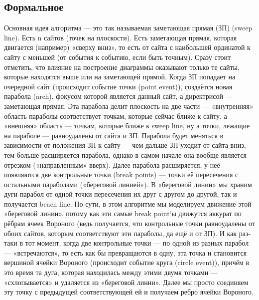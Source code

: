 \documentclass[12 pt, a4paper]{article}
\begin{document}
\subsection{Формальное}
Основная идея алгоритма — это так называемая заметающая прямая (ЗП) (sweep line). Есть n сайтов (точек на плоскости). Есть заметающая прямая, которая двигается (например) «сверху вниз», то есть от сайта с наибольшей ординатой к сайту с меньшей (от события к событию, если быть точным). Сразу стоит отметить, что влияние на построение диаграммы оказывают только те сайты, которые находятся выше или на заметающей прямой.
Когда ЗП попадает на очередной сайт (происходит событие точки (point event)), создаётся новая парабола (arch), фокусом которой является данный сайт, а директрисой — заметающая прямая. Эта парабола делит плоскость на две части — «внутренняя» область параболы соответствует точкам, которые сейчас ближе к сайту, а «внешняя» область — точкам, которые ближе к sweep line, ну а точки, лежащие на параболе — равноудалены от сайта и ЗП. Парабола будет меняться в зависимости от положения ЗП к сайту — чем дальше ЗП уходит от сайта вниз, тем больше расширяется парабола, однако в самом начале она вообще является отрезком («направленным» вверх).
Далее парабола расширяется, у неё появляются две контрольные точки (break points) — точки её пересечения с остальными параболами («береговой линией»). В «береговой линии» мы храним дуги парабол от одной точки пересечения их друг с другом до другой, так и получается beach line. По сути, в этом алгоритме мы моделируем движение этой «береговой линии». потому как эти самые break point`ы движутся аккурат по рёбрам ячеек Вороного (ведь получается, что контрольные точки равноудалены от обоих сайтов, которым соответствуют эти параболы, да ещё и от ЗП).
И как раз-таки в тот момент, когда две контрольные точки — по одной из разных парабол — «встречаются», то есть как бы превращаются в одну, эта точка и становится вершиной ячейки Вороного (происходит событие круга (circle event)), причём в это время та дуга, которая находилась между этими двумя точками — «схлопывается» и удаляется из «береговой линии». Далее мы просто соединяем эту точку с предыдущей соответствующей ей и получаем ребро ячейки Вороного.
\newpage
\end{document}

